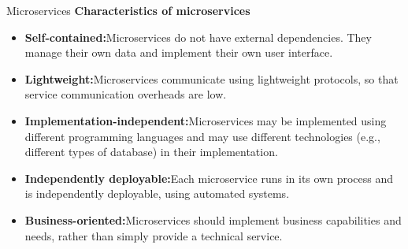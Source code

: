 \documentclass{beamer}
\begin{document}
\begin{frame}{Microservices}
	\textbf{Characteristics of microservices}
	\begin{itemize}
		\item \textbf{Self-contained:}Microservices do not have external dependencies. They 
		manage their own data and implement their own user 
		interface.
		\item \textbf{Lightweight:}Microservices communicate using lightweight protocols, 
		so that service communication overheads are low.
		\item \textbf{Implementation-independent:}Microservices may be implemented using different 
		programming languages and may use different 
		technologies (e.g., different types of database) in their 
		implementation.
		\item \textbf{Independently deployable:}Each microservice runs in its own process and is 
		independently deployable, using automated systems.
		\item \textbf{Business-oriented:}Microservices should implement business capabilities and 
		needs, rather than simply provide a technical service.		
	\end{itemize}
\end{frame}
\end{document}
